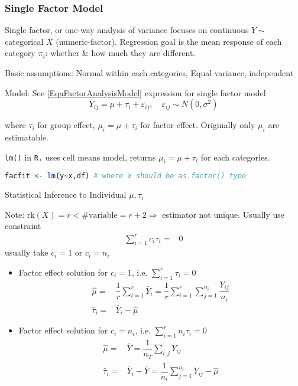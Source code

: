 \subsubsection{Single Factor Model}
    Single factor, or one-way analysis of variance focuses on continuous $ Y \sim $ categorical $ X $ (numeric-factor). Regression goal is the mean response of each category $ \pi_i $: whether \& how much they are different.

    Basic assumptions: Normal within each categories, Equal variance, independent

    Model: See \autoref{EqaFactorAnalysisModel} expression for single factor model
    \begin{equation}
        Y_{ij}=\mu+\tau_i+\varepsilon _{ij},\quad \varepsilon _{ij}\sim N(0,\sigma ^2)
    \end{equation}

    where $ \tau_i $ for group effect, $ \mu_i=\mu +\tau_i $ for factor effect. Originally only $ \mu_i $ are estimatable.

\begin{rcode}
    \lstinline|lm()| in \lstinline|R.| uses cell means model, returns $ \mu_i=\mu +\tau_i $ for each categories.
\begin{lstlisting}[language=R]
facfit <- lm(y~x,df) # where x should be as.factor() type
\end{lstlisting}
\end{rcode}    

\begin{point}
    Statistical Inference to Individual $ \mu ,\tau_i $
\end{point}

    Note: $ \mathrm{rk}(X)=r<\# \mathrm{variable}=r+2 \Rightarrow $ estimator not unique. Usually use constraint
\begin{align*}
    \sum_{i=1}^rc_i\tau_i=&0
\end{align*}
    usually take $ c_i=1 $ or $ c_i=n_i $

\begin{itemize}[topsep=2pt,itemsep=0pt]
    \item Factor effect solution for $ c_i=1 $, i.e. $ \sum_{i=1}^r \tau _i=0 $
\begin{align*}
    \hat{\mu }=&\dfrac{1}{r}\sum_{i=1}^r\bar{Y}_i=\dfrac{1}{r}\sum_{i=1}^r\sum_{j=1}^{n_i}\dfrac{Y_{ij}}{n_i}\\
    \hat{\tau}_i=&\bar{Y}_i-\hat{\mu }
\end{align*}
    \item Factor effect solution for $ c_i=n_i $, i.e. $ \sum_{i=1}^r n_i\tau _i=0 $
\begin{align*}
    \hat{\mu }=&\bar{Y}=\dfrac{1}{n_T}\sum_{i,j}Y_{ij}\\
    \hat{\tau}_i=&\bar{Y}_i-\bar{Y}=\dfrac{1}{n_i}\sum_{j=1}^{n_i}Y_{ij}-\hat{\mu}\\
\end{align*}

\end{itemize}

